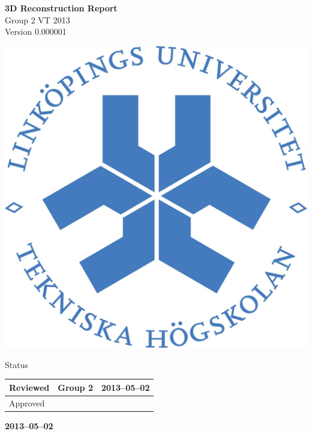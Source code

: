 \documentclass[pdftex, fontsize=11pt, a4paper]{scrbook}
\begin{document}
\begin{titlepage}
\thispagestyle{empty}
\begin{center}
	\vspace*{4\baselineskip}

	\textbf{\huge 3D Reconstruction Report} \\
	\vspace*{0.5\baselineskip}
	{\large  Group 2 VT 2013} \\
	\vspace*{0.5\baselineskip}
	{\large  Version 0.000001}


	\vspace*{6\baselineskip}
	\includegraphics[width=0.4\linewidth]{lith_sigill_col}


	\normalfont
	\small
	\vfill


	{\large  Status} \\
	\vspace*{1\baselineskip}
	\begin{tabular}{|p{4cm}|p{4cm}|p{4cm}|}
		\hline
		Reviewed & Group 2 & 2013--05--02 \\
		\hline
		Approved &   &    \\
		\hline
	\end{tabular}


	\vspace*{2\baselineskip}

	\textbf{2013--05--02} \\
	[2\baselineskip]
\end{center}

\end{titlepage}
\end{document}

